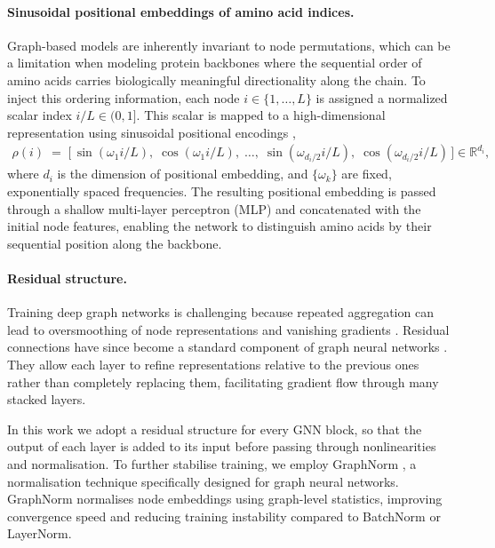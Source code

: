 \documentclass[a4paper,12pt]{article}
\begin{document}
\paragraph{Sinusoidal positional embeddings of amino acid indices.}
Graph-based models are inherently invariant to node permutations, which can be a limitation when modeling protein backbones where the sequential order of amino acids carries biologically meaningful directionality along the chain. To inject this ordering information, each node \(i \in \{1,\dots,L\}\) is assigned a normalized scalar index \(i/L \in (0,1]\). This scalar is mapped to a high-dimensional representation using sinusoidal positional encodings \citep{vaswaniAttentionAllYou2017},
\begin{align}\label{eq:positional-embedding}
    \rho(i) \;=\; \big[\, \sin(\omega_1 i/L),\; \cos(\omega_1 i/L),\; \dots,\; \sin(\omega_{d_i/2} i/L),\; \cos(\omega_{d_i/2} i/L)\,\big]\in\mathbb{R}^{d_i},
\end{align}
where \(d_i\) is the dimension of positional embedding, and \(\{\omega_k\}\) are fixed, exponentially spaced frequencies. The resulting positional embedding is passed through a shallow multi-layer perceptron (MLP) and concatenated with the initial node features, enabling the network to distinguish amino acids by their sequential position along the backbone.

\paragraph{Residual structure.}
Training deep graph networks is challenging because repeated aggregation can lead to oversmoothing of node representations and vanishing gradients \citep{li2018DeeperInsightsGraph,li2019DeepGCNsCanGCNs}. Residual connections \citep{he2016DeepResidualLearning} have since become a standard component of graph neural networks \citep{kipf2017SemiSupervisedClassificationGraph,li2019DeepGCNsCanGCNs}. They allow each layer to refine representations relative to the previous ones rather than completely replacing them, facilitating gradient flow through many stacked layers.

In this work we adopt a residual structure for every GNN block, so that the output of each layer is added to its input before passing through nonlinearities and normalisation. To further stabilise training, we employ GraphNorm \citep{cai2021GraphNormPrincipledApproach}, a normalisation technique specifically designed for graph neural networks. GraphNorm normalises node embeddings using graph-level statistics, improving convergence speed and reducing training instability compared to BatchNorm or LayerNorm. 
\end{document}
